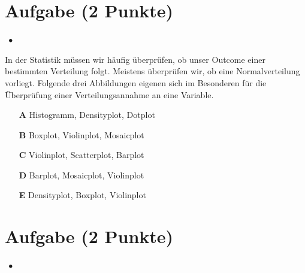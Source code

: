 \documentclass[a4paper, 9pt]{scrartcl}\usepackage[]{graphicx}\usepackage[]{xcolor}
\begin{document}
\section{Aufgabe \hfill (2 Punkte)}

\ifcollection
\begin{flushright}
\tiny\vspace{-2Ex}
\textbf{\examinhaltstart}
\exammodulestatversuch $\;\bullet$
\exammodulebiostat
\vspace{-1Ex}
\end{flushright}
\fi




In der Statistik müssen wir häufig überprüfen, ob unser Outcome einer bestimmten Verteilung folgt. Meistens überprüfen wir, ob eine
Normalverteilung vorliegt. Folgende drei Abbildungen eigenen sich im Besonderen für die Überprüfung einer Verteilungsannahme an eine Variable.





\begin{enumerate}
\item [\textbf{A} \msquare] Histogramm, Densityplot, Dotplot
\item [\textbf{B} \msquare] Boxplot, Violinplot, Mosaicplot
\item [\textbf{C} \msquare] Violinplot, Scatterplot, Barplot
\item [\textbf{D} \msquare] Barplot, Mosaicplot, Violinplot
\item [\textbf{E} \msquare] Densityplot, Boxplot, Violinplot
\end{enumerate}

\section{Aufgabe \hfill (2 Punkte)}


\ifcollection
\begin{flushright}
\tiny\vspace{-2Ex}
\textbf{\examinhaltstart}
\exammodulestatversuch $\;\bullet$
\exammodulebiostat
\vspace{-1Ex}
\end{flushright}
\fi
\end{document}
